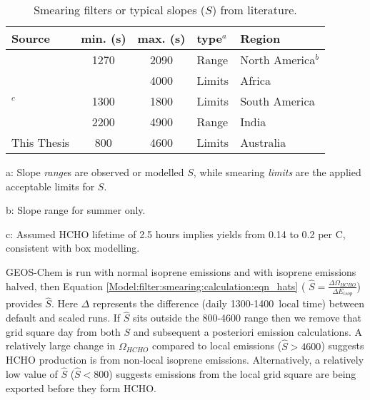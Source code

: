       \begin{table}\begin{threeparttable}
        \caption{Smearing filters or typical slopes ($S$) from literature.}
        \begin{tabular}{ l | c  c  l  >{\centering\arraybackslash}p{3cm} } 
          \toprule
          Source & min. (s) & max. (s) & type$^a$ & Region \\
          \midrule
          \textcite{Palmer2003}      & 1270 & 2090 & Range & North America$^{b}$ \\
          \textcite{Marais2012}      &      & 4000 & Limits & Africa \\
          \textcite{Barkley2013}$^c$ & 1300 & 1800 & Limits & South America \\
          \textcite{Surl2018}        & 2200 & 4900 & Range & India \\
          This Thesis             & 800  & 4600 & Limits & Australia \\
          \bottomrule
        \end{tabular}
        \begin{tablenotes}
          \small
          \item a: Slope \textit{range}s are observed or modelled $S$, while smearing \textit{limits} are the applied acceptable limits for $S$. 
          \item b: Slope range for summer only.
          \item c: Assumed HCHO lifetime of 2.5 hours implies yields from 0.14 to 0.2 per C, consistent with box modelling.
        \end{tablenotes}
        \label{Model:filter:smearing:tab_smearing_ranges}
      \end{threeparttable}\end{table}
      
      
      
      GEOS-Chem is run with normal isoprene emissions and with isoprene emissions halved, then Equation \ref{Model:filter:smearing:calculation:eqn_hats} ( $\hat{S} = \frac{\Delta \Omega_{HCHO}}{\Delta E_{isop}} $) provides $\hat{S}$.
      Here $\Delta$ represents the difference (daily 1300-1400~local time) between default and scaled runs.
      If $\hat{S}$ sits outside the 800-4600 range then we remove that grid square day from both $S$ and subsequent a posteriori emission calculations.
      A relatively large change in $\Omega_{HCHO}$ compared to local emissions ($\hat{S}>4600$) suggests HCHO production is from non-local isoprene emissions.
      Alternatively, a relatively low value of $\hat{S}$ ($\hat{S}<800$) suggests emissions from the local grid square are being exported before they form HCHO.
      

